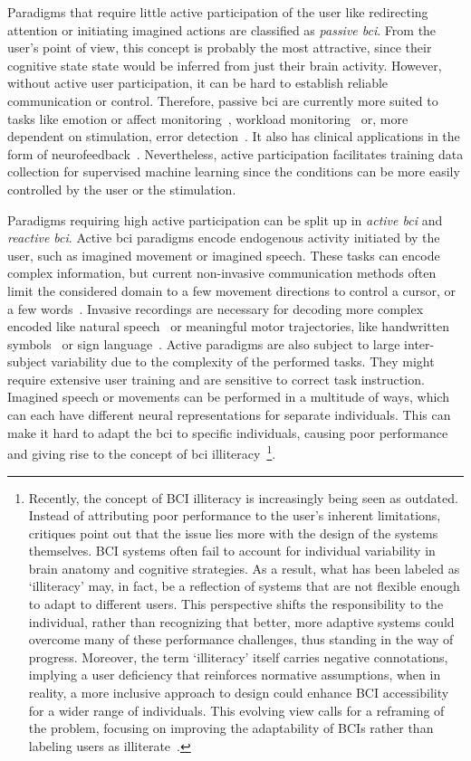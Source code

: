 Paradigms that require little active participation of the user like
redirecting attention or initiating imagined actions are classified as \emph{passive
\ac{bci}}.
From the user's point of view, this concept is probably the most attractive,
since their cognitive state state would be inferred from just
their brain activity.
However, without active user participation, it can be hard to establish reliable
communication or control.
Therefore, passive \ac{bci} are currently more suited to tasks like
emotion or affect monitoring~\cite{Torres2020,Libert2019, Muehl2014}, workload
monitoring~\cite{Zanetti2021} or, more dependent on stimulation, error
detection~\cite{SiMohammed2020}.
It also has clinical applications in the form of neurofeedback~\cite{Hammond2011}.
Nevertheless, active participation facilitates training data collection for
supervised machine learning since the conditions can be more easily controlled
by the user or the stimulation.


Paradigms requiring high active participation can be split up in \emph{active
\ac{bci}} and \emph{reactive \ac{bci}}.
Active \ac{bci} paradigms encode endogenous activity initiated by the user,
such as imagined movement or imagined speech.
These tasks can encode complex information, but current non-invasive
communication methods often limit the considered domain to a few movement
directions to control a cursor, or a few words~\cite{Panachakel2021}.
Invasive recordings are necessary for decoding more complex encoded
like natural speech~\cite{Metzger2023} or meaningful motor trajectories, like handwritten
symbols~\cite{Willett2021} or sign language~\cite{Branco2017}.
Active paradigms are also subject to large inter-subject variability due to the
complexity of the performed tasks.
They might require extensive user training and are sensitive to
correct task instruction.
Imagined speech or movements can be performed in a multitude of ways, which
can each have different neural representations for separate individuals.
This can make it hard to adapt the \ac{bci} to specific individuals, causing
poor performance and giving rise to the concept of \ac{bci}
illiteracy~\cite{Allison2010}\footnote{%
Recently, the concept of BCI illiteracy is increasingly being seen as outdated.
Instead of attributing poor performance to the user's inherent limitations,
critiques point out that the issue lies more with the design of the
systems themselves. BCI systems often fail to account for individual
variability in brain anatomy and cognitive strategies. As a result, what has
been labeled as `illiteracy' may, in fact, be a reflection of systems that are
not flexible enough to adapt to different users. This perspective
shifts the responsibility to the individual, rather than recognizing that
better, more adaptive systems could overcome many of these performance
challenges, thus standing in the way of progress.
Moreover, the term `illiteracy' itself carries negative
connotations, implying a user deficiency that reinforces normative assumptions,
when in reality, a more inclusive approach to design could enhance BCI
accessibility for a wider range of individuals. This evolving view calls for a
reframing of the problem, focusing on improving the adaptability of BCIs rather
than labeling users as illiterate~\cite{Becker2022,Thompson2019}.
}.

